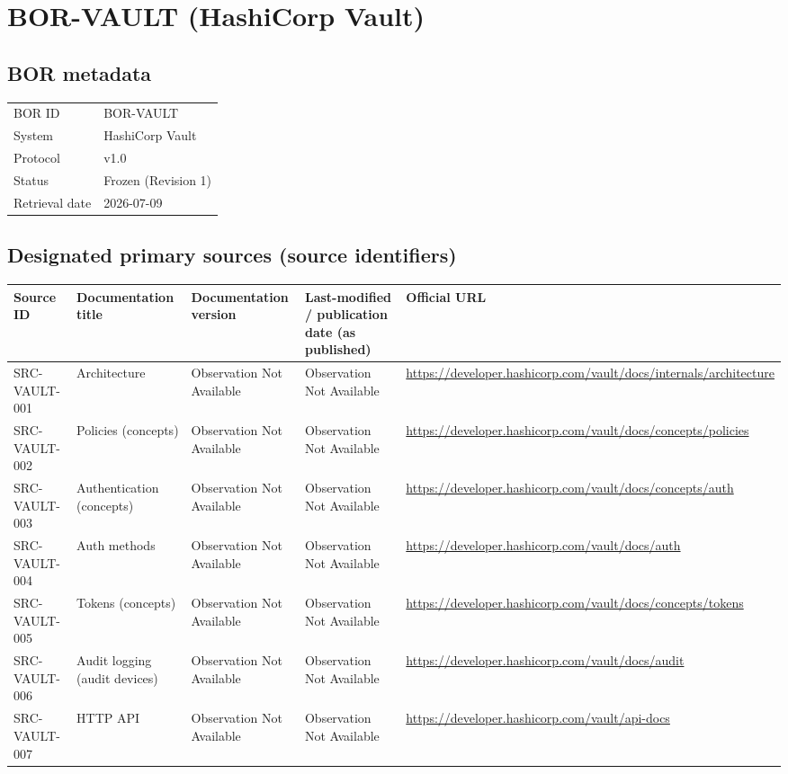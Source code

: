 \documentclass[11pt]{article}
\begin{document}
\section*{BOR-VAULT (HashiCorp Vault)}
\subsection*{BOR metadata}
\begin{tabular}{@{}L{2.2in}L{4.2in}@{}}
\toprule
BOR ID & BOR-VAULT\\
System & HashiCorp Vault\\
Protocol & v1.0\\
Status & Frozen (Revision 1)\\
Retrieval date & 2026-07-09\\
\bottomrule
\end{tabular}

\subsection*{Designated primary sources (source identifiers)}
\begin{longtable}{@{}L{1.6in}L{2.9in}L{1.0in}L{0.9in}L{1.9in}@{}}
\toprule
Source ID & Documentation title & Documentation version & Last-modified / publication date (as published) & Official URL\\
\midrule
\endhead
SRC-VAULT-001 & Architecture & Observation Not Available & Observation Not Available & \url{https://developer.hashicorp.com/vault/docs/internals/architecture}\\
SRC-VAULT-002 & Policies (concepts) & Observation Not Available & Observation Not Available & \url{https://developer.hashicorp.com/vault/docs/concepts/policies}\\
SRC-VAULT-003 & Authentication (concepts) & Observation Not Available & Observation Not Available & \url{https://developer.hashicorp.com/vault/docs/concepts/auth}\\
SRC-VAULT-004 & Auth methods & Observation Not Available & Observation Not Available & \url{https://developer.hashicorp.com/vault/docs/auth}\\
SRC-VAULT-005 & Tokens (concepts) & Observation Not Available & Observation Not Available & \url{https://developer.hashicorp.com/vault/docs/concepts/tokens}\\
SRC-VAULT-006 & Audit logging (audit devices) & Observation Not Available & Observation Not Available & \url{https://developer.hashicorp.com/vault/docs/audit}\\
SRC-VAULT-007 & HTTP API & Observation Not Available & Observation Not Available & \url{https://developer.hashicorp.com/vault/api-docs}\\
\bottomrule
\end{longtable}
\end{document}
